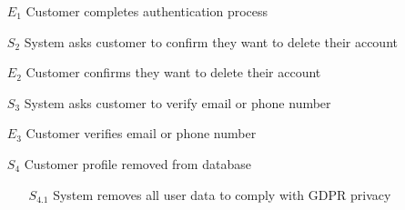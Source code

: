 \documentclass[]{article}
\begin{document}
\begin{enumerate}[{\textbf{BE}}1.]
\begin{enumerate}[{\textbf{VP3}}.1]
\begin{enumerate}
                   	 \item[$E_1$] Customer completes authentication process
			\item[$S_2$] System asks customer to confirm they want to delete their account
                   \item[$E_2$] Customer confirms they want to delete their account
\color{blue}
                \item[$S_3$] System asks customer to verify email or phone number
                \item[$E_3$] Customer verifies email or phone number
\color{black}
                \item[$S_4$] Customer profile removed from database
\begin{enumerate}
		\item[$S_{4.1}$] System removes all user data to comply with GDPR privacy
\end{enumerate}
            \end{enumerate}
    \end{enumerate}



\end{enumerate}
\end{document}

